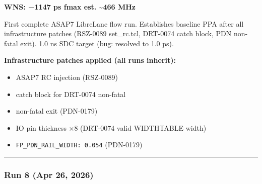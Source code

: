 \begin{record}

\textbf{WNS: −1147 ps \textbar{} fmax est. \textasciitilde466 MHz}

First complete ASAP7 LibreLane flow run. Establishes baseline PPA after
all infrastructure patches (RSZ-0089 set\_\allowbreak{}rc.tcl, DRT-0074
catch block, PDN non-fatal exit). 1.0 ns SDC target (bug: resolved to
1.0 ps).

\textbf{Infrastructure patches applied (all runs inherit):}

\begin{itemize}
\tightlist
\item
   ASAP7 RC injection (RSZ-0089)
\item
   catch block for DRT-0074 non-fatal
\item
   non-fatal exit (PDN-0179)
\item
  IO pin thickness ×8 (DRT-0074 valid WIDTHTABLE width)
\item
  \texttt{FP\_\allowbreak{}PDN\_\allowbreak{}RAIL\_\allowbreak{}WIDTH:\allowbreak{}\ 0.\allowbreak{}054}
  (PDN-0179)
\end{itemize}

\begin{center}\rule{0.5\linewidth}{0.5pt}\end{center}

\end{record}

\subsubsection{Run 8 (Apr 26, 2026)}\label{cr:run:asap7-cpu:run-8-apr-26-2026}

